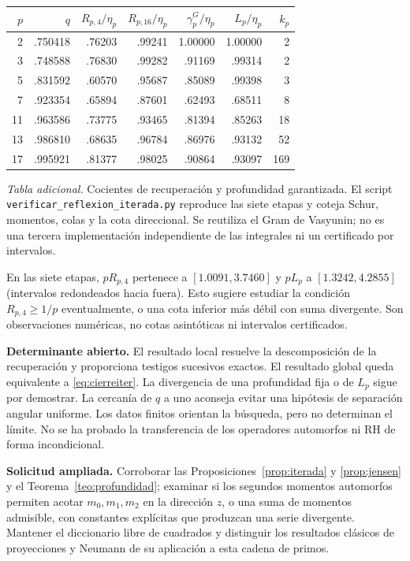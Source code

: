 \documentclass[11pt,a4paper]{article}
\theoremstyle{plain}
\begin{document}
\begin{center}\small
\begin{tabular}{rrrrrrr}
\toprule
$p$ & $q$ & $R_{p,4}/\eta_p$ & $R_{p,16}/\eta_p$ & $\gamma_p^G/\eta_p$ & $L_p/\eta_p$ & $k_p$\\
\midrule
2 & .750418 & .76203 & .99241 & 1.00000 & 1.00000 & 2\\
3 & .748588 & .76830 & .99282 & .91169 & .99314 & 2\\
5 & .831592 & .60570 & .95687 & .85089 & .99398 & 3\\
7 & .923354 & .65894 & .87601 & .62493 & .68511 & 8\\
11 & .963586 & .73775 & .93465 & .81394 & .85263 & 18\\
13 & .986810 & .68635 & .96784 & .86976 & .93132 & 52\\
17 & .995921 & .81377 & .98025 & .90864 & .93097 & 169\\
\bottomrule
\end{tabular}
\end{center}
\textit{Tabla adicional.} Cocientes de recuperación y profundidad garantizada. El script \texttt{verificar\_\allowbreak{}reflexion\_\allowbreak{}iterada.py} reproduce las siete etapas y coteja Schur, momentos, colas y la cota direccional. Se reutiliza el Gram de Vasyunin; no es una tercera implementación independiente de las integrales ni un certificado por intervalos.

En las siete etapas, $pR_{p,4}$ pertenece a $[1.0091,3.7460]$ y $pL_p$ a $[1.3242,4.2855]$ (intervalos redondeados hacia fuera). Esto sugiere estudiar la condición $R_{p,4}\ge 1/p$ eventualmente, o una cota inferior más débil con suma divergente. Son observaciones numéricas, no cotas asintóticas ni intervalos certificados.

\textbf{Determinante abierto.} El resultado local resuelve la descomposición de la recuperación y proporciona testigos sucesivos exactos. El resultado global queda equivalente a \eqref{eq:cierreiter}. La divergencia de una profundidad fija o de $L_p$ sigue por demostrar. La cercanía de $q$ a uno aconseja evitar una hipótesis de separación angular uniforme. Los datos finitos orientan la búsqueda, pero no determinan el límite. No se ha probado la transferencia de los operadores automorfos ni RH de forma incondicional.

\textbf{Solicitud ampliada.} Corroborar las Proposiciones~\ref{prop:iterada} y \ref{prop:jensen} y el Teorema~\ref{teo:profundidad}; examinar si los segundos momentos automorfos permiten acotar $m_0,m_1,m_2$ en la dirección $z$, o una suma de momentos admisible, con constantes explícitas que produzcan una serie divergente. Mantener el diccionario libre de cuadrados y distinguir los resultados clásicos de proyecciones y Neumann de su aplicación a esta cadena de primos.
\end{document}
